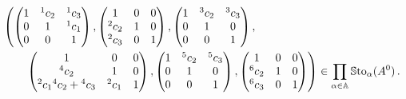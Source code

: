 \begin{align*}
  &\left(
    \begin{pmatrix} 1 & {}^1c_2 & {}^1c_3 \\0 & 1 & {}^1c_1 \\0 & 0 & 1 \end{pmatrix},
    \begin{pmatrix} 1 & 0 & 0 \\{}^2c_2 & 1 & 0 \\{}^2c_3 & 0 & 1 \end{pmatrix},
    \begin{pmatrix} 1 & {}^3c_2 & {}^3c_3 \\0 & 1 & 0 \\0 & 0 & 1 \end{pmatrix},
  \right.
\\&\qquad
  \left.
    \begin{pmatrix} 1 & 0 & 0 \\{}^4c_2 & 1 & 0 \\{}^2c_1{}^4c_2+{}^4c_3 & {}^2c_1 & 1 \end{pmatrix},
    \begin{pmatrix} 1 & {}^5c_2 & {}^5c_3 \\0 & 1 & 0 \\0 & 0 & 1 \end{pmatrix},
    \begin{pmatrix} 1 & 0 & 0 \\{}^{6}c_2 & 1 & 0 \\{}^{6}c_3 & 0 & 1 \end{pmatrix}
  \right)
  \in
  \prod_{\alpha\in\mathbb{A}}\operatorname{\mathbb{S}to}_{\alpha}(A^0) \,.
\end{align*}
